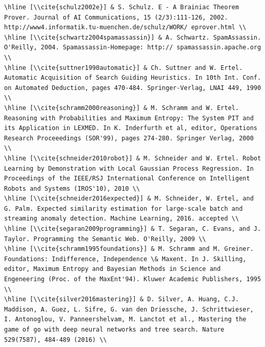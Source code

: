 \documentclass[10pt]{book}
\begin{document}
\begin{verbatim}
\hline [\\cite{schulz2002e}] & S. Schulz. E - A Brainiac Theorem Prover. Journal of AI Communications, 15 (2/3):111-126, 2002. http://www4.informatik.tu-muenchen.de/schulz/WORK/ eprover.html \\
\hline [\\cite{schwartz2004spamassassin}] & A. Schwartz. SpamAssassin. O'Reilly, 2004. Spamassassin-Homepage: http:// spamassassin.apache.org \\
\hline [\\cite{suttner1990automatic}] & Ch. Suttner and W. Ertel. Automatic Acquisition of Search Guiding Heuristics. In 10th Int. Conf. on Automated Deduction, pages 470-484. Springer-Verlag, LNAI 449, 1990 \\
\hline [\\cite{schramm2000reasoning}] & M. Schramm and W. Ertel. Reasoning with Probabilities and Maximum Entropy: The System PIT and its Application in LEXMED. In K. Inderfurth et al, editor, Operations Research Proceeedings (SOR'99), pages 274-280. Springer Verlag, 2000 \\
\hline [\\cite{schneider2010robot}] & M. Schneider and W. Ertel. Robot Learning by Demonstration with Local Gaussian Process Regression. In Proceedings of the IEEE/RSJ International Conference on Intelligent Robots and Systems (IROS'10), 2010 \\
\hline [\\cite{schneider2016expected}] & M. Schneider, W. Ertel, and G. Palm. Expected similarity estimation for large-scale batch and streaming anomaly detection. Machine Learning, 2016. accepted \\
\hline [\\cite{segaran2009programming}] & T. Segaran, C. Evans, and J. Taylor. Programming the Semantic Web. O'Reilly, 2009 \\
\hline [\\cite{schramm1995foundations}] & M. Schramm and M. Greiner. Foundations: Indifference, Independence \& Maxent. In J. Skilling, editor, Maximum Entropy and Bayesian Methods in Science and Engeneering (Proc. of the MaxEnt'94). Kluwer Academic Publishers, 1995 \\
\hline [\\cite{silver2016mastering}] & D. Silver, A. Huang, C.J. Maddison, A. Guez, L. Sifre, G. van den Driessche, J. Schrittwieser, I. Antonoglou, V. Panneershelvam, M. Lanctot et al., Mastering the game of go with deep neural networks and tree search. Nature 529(7587), 484-489 (2016) \\

\end{verbatim}
\end{document}

